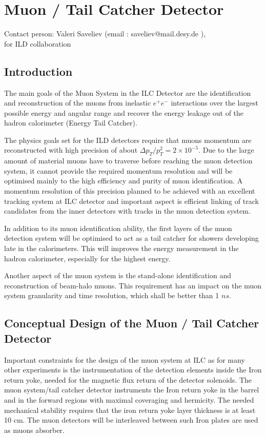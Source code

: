 \documentclass[12pt,twoside,a4paper]{book}
\begin{document}
\chapter{Muon / Tail Catcher Detector}
Contact person: Valeri Saveliev (email : saveliev@mail.desy.de ), \\
for ILD collaboration

\section{Introduction}
The main goals of the Muon System in the ILC Detector are the identification and reconstruction of the muons from inelastic $e^+e^-$ interactions over the largest possible energy and angular range and recover the energy leakage out of the hadron calorimeter (Energy Tail Catcher).

The physics goals set for the ILD detectors require that muons momentum are reconstructed with high precision of about $\Delta p_T/p^2_T = 2 \times10^{-5}$.
Due to the large amount of material muons have to traverse before reaching the muon detection system,  it cannot provide the required  momentum resolution and will be optimised mainly to the high efficiency and purity of muon identification.
A momentum resolution of this precision planned to be achieved with an excellent tracking system at ILC detector and important aspect is efficient linking of track candidates from the inner detectors with tracks in the muon detection system.

In addition to its muon identification ability, the first layers of the muon detection system will be optimised to act as a tail catcher for showers developing late in the calorimeters. This will improves the energy measurement in the hadron calorimeter, especially for the highest energy.

Another aspect of the muon system is the stand-alone identification and reconstruction of beam-halo muons. This requirement has an impact on the muon system granularity and time resolution, which shall be better than 1 $ns$.

\section{Conceptual Design of the Muon / Tail Catcher Detector}
Important constraints for the design of the muon system at ILC  as for many other experiments is the instrumentation of the detection elements inside the Iron return yoke, needed for the magnetic flux return of the detector solenoids.
The muon system/tail catcher detector instruments the Iron return yoke in the barrel and in the forward regions with maximal coveraging and hermicity.
The needed mechanical stability requires that the iron return yoke layer thickness is at least 10 cm.
The muon detectors will be interleaved between such Iron plates are used as muons absorber.
\end{document}

